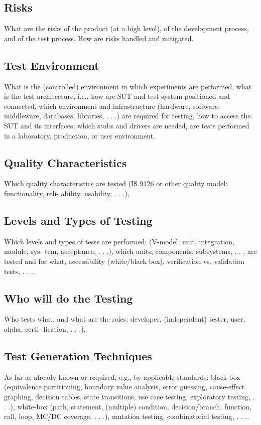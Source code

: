 \documentclass[11pt,a4paper]{article}
\begin{document}
\subsection{Risks}
\label{sec:orgheadline15}
What are the risks of the product (at a high level), of the development process, and of the
test process. How are risks handled and mitigated.
\subsection{Test Environment}
\label{sec:orgheadline16}
What is the (controlled) environment in which experiments are performed, what is the test
architecture, i.e., how are SUT and test system positioned and connected, which environment
and infrastructure (hardware, software, middleware, databases, libraries, . . .) are required for
testing, how to access the SUT and its interfaces, which stubs and drivers are needed, are
tests performed in a laboratory, production, or user environment.
\subsection{Quality Characteristics}
\label{sec:orgheadline17}
Which quality characteristics are tested (IS 9126 or other quality model: functionality, reli-
ability, usability, . . .),
\subsection{Levels and Types of Testing}
\label{sec:orgheadline18}
Which levels and types of tests are performed: (V-model: unit, integration, module, sys-
tem, acceptance, . . .), which units, components, subsystems, . . . are tested and for what,
accessibility (white/black box), verification vs. validation tests, . . ..
\subsection{Who will do the Testing}
\label{sec:orgheadline19}
Who tests what, and what are the roles: developer, (independent) tester, user, alpha, certi-
fication, . . .),
\subsection{Test Generation Techniques}
\label{sec:orgheadline20}
As far as already known or required, e.g., by applicable standards: black-box (equivalence
partitioning, boundary value analysis, error guessing, cause-effect graphing, decision tables,
state transitions, use case testing, exploratory testing, . . .), white-box (path, statement,
(multiple) condition, decision/branch, function, call, loop, MC/DC coverage, . . .), mutation
testing, combinatorial testing, . . ..
\end{document}

